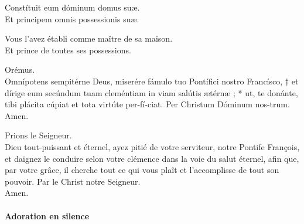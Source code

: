 \documentclass[twoside]{article}
\begin{document}
\begin{paracol}{2}

\vv Constítuit eum dóminum domus suæ.\\
\rr Et principem omnis possessionis suæ.

\switchcolumn

\vv Vous l’avez établi comme maître de sa maison.\\
\rr Et prince de toutes ses possessions.

\switchcolumn*

\vv Orémus.\\
Omnípotens sempitérne Deus, miserére fámulo tuo Pontífici nostro Francísco, † et dírige
eum secúndum tuam cleméntiam in viam salútis ætérnæ ; * ut, te donánte, tibi plácita
cúpiat et tota virtúte per-fí-ciat.
Per Christum Dóminum nos-trum. \\
\rr Amen.

\switchcolumn

\vv Prions le Seigneur.\\
Dieu tout-puissant et éternel, ayez pitié de votre serviteur, notre Pontife François, et daignez le conduire selon votre clémence dans la voie du salut
éternel, afin que, par votre grâce, il cherche tout ce
qui vous plaît et l’accomplisse de tout son pouvoir.
Par le Christ notre Seigneur.\\
\rr Amen.

\end{paracol}

\paragraph{Adoration en silence}

\end{document}
